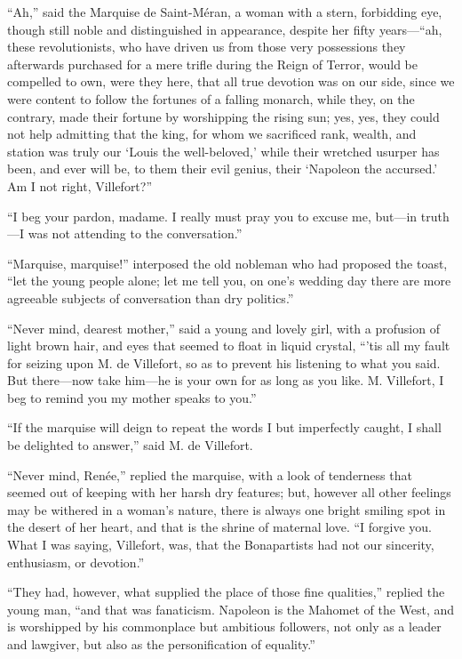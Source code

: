 “Ah,” said the Marquise de Saint-Méran, a woman with a stern,
forbidding eye, though still noble and distinguished in appearance,
despite her fifty years—“ah, these revolutionists, who have driven us
from those very possessions they afterwards purchased for a mere trifle
during the Reign of Terror, would be compelled to own, were they here,
that all true devotion was on our side, since we were content to follow
the fortunes of a falling monarch, while they, on the contrary, made
their fortune by worshipping the rising sun; yes, yes, they could not
help admitting that the king, for whom we sacrificed rank, wealth, and
station was truly our ‘Louis the well-beloved,’ while their wretched
usurper has been, and ever will be, to them their evil genius, their
‘Napoleon the accursed.’ Am I not right, Villefort?”

“I beg your pardon, madame. I really must pray you to excuse me, but—in
truth—I was not attending to the conversation.”

“Marquise, marquise!” interposed the old nobleman who had proposed the
toast, “let the young people alone; let me tell you, on one’s wedding
day there are more agreeable subjects of conversation than dry
politics.”

“Never mind, dearest mother,” said a young and lovely girl, with a
profusion of light brown hair, and eyes that seemed to float in liquid
crystal, “’tis all my fault for seizing upon M. de Villefort, so as to
prevent his listening to what you said. But there—now take him—he is
your own for as long as you like. M. Villefort, I beg to remind you my
mother speaks to you.”

“If the marquise will deign to repeat the words I but imperfectly
caught, I shall be delighted to answer,” said M. de Villefort.

“Never mind, Renée,” replied the marquise, with a look of tenderness
that seemed out of keeping with her harsh dry features; but, however
all other feelings may be withered in a woman’s nature, there is always
one bright smiling spot in the desert of her heart, and that is the
shrine of maternal love. “I forgive you. What I was saying, Villefort,
was, that the Bonapartists had not our sincerity, enthusiasm, or
devotion.”

“They had, however, what supplied the place of those fine qualities,”
replied the young man, “and that was fanaticism. Napoleon is the
Mahomet of the West, and is worshipped by his commonplace but ambitious
followers, not only as a leader and lawgiver, but also as the
personification of equality.”

